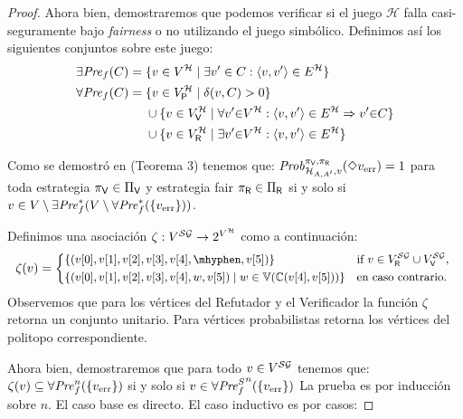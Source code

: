 \begin{proof}
Ahora bien, demostraremos que podemos verificar si el juego $\mathcal{H}$ falla casi-seguramente bajo \emph{fairness} o no utilizando el juego simbólico. Definimos así los siguientes conjuntos sobre este juego:
\begin{align*}
  \exists\mathit{Pre}_f(C) = {}&\{ v \in V^{\mathcal{H}} \mid\exists v' \in C : \langle v,v' \rangle \in E^\mathcal{H} \} \\
  \forall\mathit{Pre}_f(C) = {}&\{ v \in V^{\mathcal{H}}_{\mathsf{P}} \mid \delta(v,C)>0\} \\
                       & \cup \{ v \in  V^{\mathcal{H}}_{\mathsf{V}} \mid \forall v' {\in} V^{\mathcal{H}} : \langle v,v' \rangle \in E^{\mathcal{H}} \Rightarrow v' {\in} C \} \\
                     & \cup \{v \in V^{\mathcal{H}}_{\mathsf{R}} \mid \exists v'{\in} V^{\mathcal{H}} : \langle v,v' \rangle \in E^\mathcal{H} \} 
\end{align*}

Como se demostró en \cite{CastroDDP22} (Teorema 3) tenemos que: 
 $\mathit{Prob}^{\pi_{\mathsf{V}}, \pi_{\mathsf{R}}}_{\mathcal{H}_{A,A'},v}(\Diamond v_{\text{err}}) = 1$ para toda estrategia 
 $\pi_{\mathsf{V}} \in \Pi_{\mathsf{V}}$ y estrategia fair $\pi_{\mathsf{R}} \in \Pi_{\mathsf{R}}$
  si y solo si $v \in V\setminus \exists\mathit{Pre}_f^*(V \setminus \forall\mathit{Pre}_f^*(\{ v_{\text{err}} \}))$.
    
 Definimos una asociación $\zeta : V^{\mathcal{SG}} \rightarrow 2^{V^{\mathcal{H}}}$ como a continuación:
 \[\small
     \zeta(v) = 
                    \begin{cases*}
                         \{(\pr{0}{v},\pr{1}{v},\pr{2}{v},\pr{3}{v},\pr{4}{v},\mhyphen, \pr{5}{v} )\} & if  $v \in V^{\SymbG}_\Refuter \cup V^{\SymbG}_\Verifier$, \\
                         \{ (\pr{0}{v},\pr{1}{v},\pr{2}{v},\pr{3}{v},\pr{4}{v},w, \pr{5}{v}) \mid w \in \vertices{\couplings{\pr{4}{v}}{\pr{5}{v}}}\} & en caso contrario.
                    \end{cases*}
 \]   
 Observemos que para los vértices del Refutador y el Verificador la función $\zeta$ retorna un conjunto unitario.  Para vértices probabilistas retorna los vértices del politopo correspondiente.
 
  Ahora bien, demostraremos que para todo $v \in V^{\mathcal{SG}}$  tenemos que:  $\zeta(v) \subseteq  \forall\mathit{Pre}_f^n(\{ v_{\text{err}} \})$ si y solo si $v \in {\forall\mathit{Pre}^S_f}^n(\{ v_{\text{err}} \})$
  La prueba es por inducción sobre $n$. El caso base es directo. El caso inductivo es por casos:
 

\end{proof}
